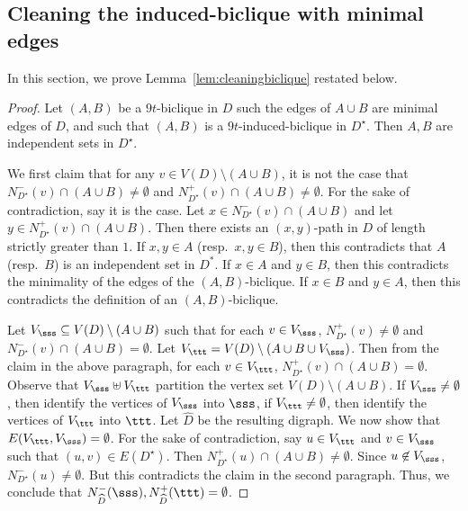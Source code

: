 \newcommand{\secondhard}{second-hard-structure}
\subsection{Cleaning the induced-biclique with minimal edges}\label{sec:cleaningbiclique}

In this section, we prove Lemma~\ref{lem:cleaningbiclique} restated below.

\cleaningbiclique*

\begin{proof}
Let $(A,B)$ be a $9t$-biclique in $D$ such the edges of $A \cup B$ are minimal edges of $D$, and such that $(A,B)$ is a $9t$-induced-biclique in $D^{\star}$. Then $A,B$ are independent sets in $D^{\star}$.

We first claim that for any $v \in V(D) \setminus (A \cup B)$, it is not the case that 
$N^-_{D^{\star}}(v) \cap (A \cup B) \neq \emptyset$ and $N^+_{D^{\star}}(v) \cap (A \cup B)\neq \emptyset$. For the sake of contradiction, say it is the case. Let $x \in N^-_{D^{\star}}(v) \cap (A \cup B)$ and let $y \in N^+_{D^{\star}}(v) \cap (A \cup B)$. Then there exists an $(x,y)$-path in $D$ of length strictly greater than $1$. If $x,y \in A$ (resp.~$x,y \in B$), then this contradicts that $A$ (resp.~$B$) is an independent set in $D^*$. If $x \in A$ and $y \in B$, then this contradicts the minimality of the edges of the $(A,B)$-biclique. If $x \in B$ and $y \in A$, then this contradicts the definition of an $(A,B)$-biclique.

Let $V_{\sss} \subseteq V(D) \setminus (A \cup B)$ such that for each $v \in V_{\sss}$, $N^+_{D^{\star}}(v) \neq \emptyset$ and $N^-_{D^{\star}}(v)  \cap (A \cup B)=\emptyset$.
Let $V_{\ttt} = V(D) \setminus (A \cup B \cup V_{\sss})$. Then from the claim in the above paragraph, 
for each $v \in V_{\ttt}$, $N^+_{D^{\star}}(v) \cap (A \cup B)=\emptyset$. 
Observe that $V_{\sss} \uplus V_{\ttt}$ partition the vertex set $V(D) \setminus (A \cup B)$. If $V_{\sss} \neq  \emptyset$, then identify the vertices of $V_{\sss}$ into $\sss$, if $V_{\ttt} \neq \emptyset$, then identify the vertices of $V_{\ttt}$ into $\ttt$. Let $\widehat{D}$ be the resulting digraph. 
We now show that $E(V_{\ttt}, V_{\sss}) =\emptyset$. For the sake of contradiction, say $u \in V_{\ttt}$ and $v \in V_{\sss}$ such that $(u,v) \in E(D^{\star})$. Then $N^+_{D^{\star}}(u) \cap (A \cup B) \neq \emptyset$.
Since $u \not \in V_{\sss}$, $N^-_{D^{\star}}(u) \neq \emptyset$. But this contradicts the claim in the second paragraph. Thus, we conclude that $N^-_{\widehat{D}}(\sss), N^+_{\widehat{D}}(\ttt) = \emptyset$.



\end{proof}
